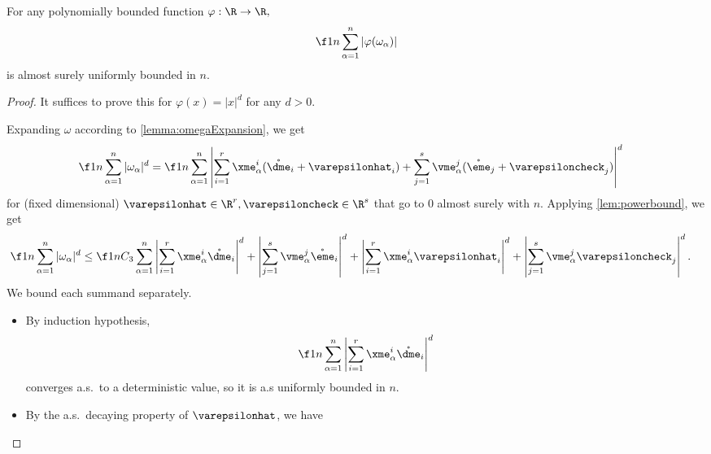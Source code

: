 \documentclass[main.tex]{subfiles}
\begin{document}
\begin{lemma}\label{lemma:omegaAlphaUnifomBounded}
  For any polynomially bounded function $\varphi: \R \to \R,$
  \[
  \f 1 n \sum_{\alpha=1}^n |\varphi(\omega_\alpha)|
  \]
  is almost surely uniformly bounded in $n$.
\end{lemma}
\begin{proof}
  It suffices to prove this for $\varphi(x) = |x|^d$ for any $d > 0$.
  
  Expanding $\omega$ according to \cref{lemma:omegaExpansion}, we get
  \begin{align*}
      \f 1 n \sum_{\alpha=1}^n |\omega_\alpha|^{d}
      &=
          \f 1 n \sum_{\alpha=1}^n \left|
              \sum_{i=1}^r
                  \xme_\alpha^i (\mathring {\dme}_i + \varepsilonhat_i)
              + \sum_{j=1}^s
                  \vme_\alpha^j (\mathring{\eme}_j + \varepsiloncheck_j)
          \right|^d
  \end{align*}
  for (fixed dimensional) $\varepsilonhat \in \R^r, \varepsiloncheck \in \R^s$ that go to 0 almost surely with $n$.
  Applying \cref{lem:powerbound}, we get
  \begin{align*}
      \f 1 n \sum_{\alpha=1}^n |\omega_\alpha|^d
      &\le
          \f 1 n C_3\sum_{\alpha=1}^n
              \left|
                  \sum_{i=1}^r
                  \xme_\alpha^i \mathring {\dme}_i
              \right|^d
              +
              \left|
                  \sum_{j=1}^s
                  \vme_\alpha^j \mathring {\eme}_i
              \right|^d
              +
              \left|
                  \sum_{i=1}^r
                  \xme_\alpha^i \varepsilonhat_i
              \right|^d
              +
              \left|
                  \sum_{j=1}^s
                  \vme_\alpha^j \varepsiloncheck_j
              \right|^d
              .
  \end{align*}
  We bound each summand separately.
  \begin{itemize}
      \item
          By induction hypothesis, 
          \begin{align*}
              \f 1 n \sum_{\alpha=1}^n
              \left|
                  \sum_{i=1}^r
                  \xme_\alpha^i \mathring {\dme}_i
              \right|^d
          \end{align*}
          converges a.s.\ to a deterministic value, so it is a.s uniformly bounded in $n.$
      \item
          By the a.s.\ decaying property of $\varepsilonhat$, we have

\end{itemize}
\end{proof}
\end{document}
